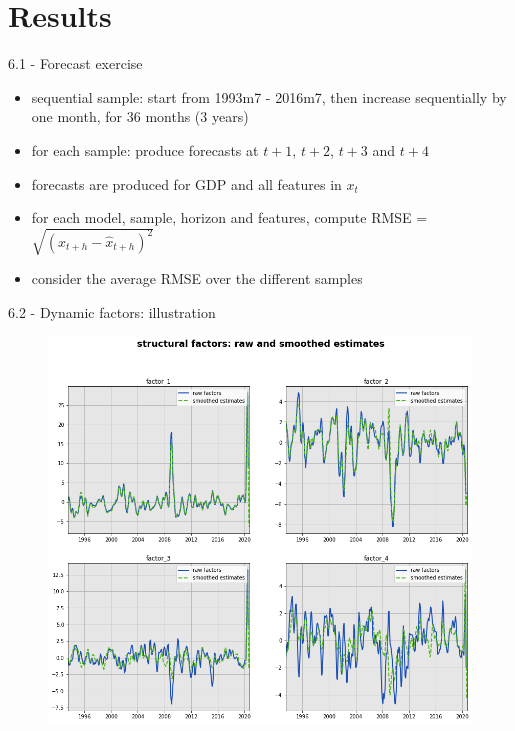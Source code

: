 \section{Results}

\begin{frame}{6.1 - Forecast exercise}
	\begin{itemize}
		\item sequential sample: start from 1993m7 - 2016m7, then increase sequentially by one month, for 36 months (3 years)
		\item for each sample: produce forecasts at $t+1$, $t+2$, $t+3$ and $t+4$
		\item forecasts are produced for GDP and all features in $x_t$
		\item for each model, sample, horizon and features, compute RMSE = $\sqrt{(x_{t+h} - \hat{x}_{t+h})^2}$
		\item consider the average RMSE over the different samples
	\end{itemize}	
\end{frame}

\begin{frame}{6.2 - Dynamic factors: illustration}
	\begin{figure}[h]
		\centering
		\includegraphics[width=.7\linewidth]{im1}
	\end{figure}
\end{frame}

